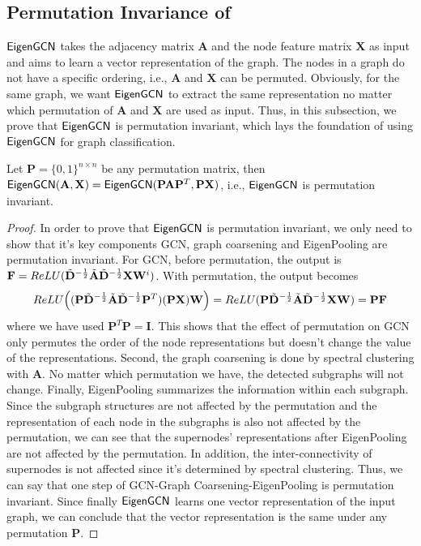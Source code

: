 \documentclass[sigconf]{acmart}
\newcommand{\m}{{\sf {EigenGCN}}}
\begin{document}
\subsection{Permutation Invariance of \m}
$\m$ takes the adjacency matrix $\mathbf{A}$ and the node feature matrix $\mathbf{X}$ as input and aims to learn a vector representation of the graph. The nodes in a graph do not have a specific ordering, i.e., $\mathbf{A}$ and $\mathbf{X}$ can be permuted. Obviously, for the same graph, we want $\m$ to extract the same representation no matter which permutation of $\mathbf{A}$ and $\mathbf{X}$ are used as input. Thus, in this subsection, we prove that $\m$ is permutation invariant, which lays the foundation of using $\m$ for graph classification.
\begin{theorem}
    Let $\mathbf{P} = \{0,1\}^{n \times n}$ be any permutation matrix, then $\m(\mathbf{A}, \mathbf{X}) = \m(\mathbf{P}\mathbf{A}\mathbf{P}^T, \mathbf{P}\mathbf{X})$, i.e., $\m$ is permutation invariant.
\end{theorem}
\vspace{-1em}
\begin{proof}
    In order to prove that $\m$ is permutation invariant, we only need to show that it's key components GCN, graph coarsening and EigenPooling are permutation invariant. For GCN, before permutation, the output is ${\bf F} = ReLU(\tilde{\bf D}^{-\frac{1}{2}}\tilde{\bf A} \tilde{\bf D}^{-\frac{1}{2}} {\bf X} {\bf W}^{i})$. With permutation, the output becomes
    \begin{equation}
        ReLU\Big((\mathbf{P}\tilde{\bf D}^{-\frac{1}{2}}\tilde{\bf A} \tilde{\bf D}^{-\frac{1}{2}} \mathbf{P}^T) (\mathbf{P}{\bf X}) {\bf W}\Big) = ReLU(\mathbf{P}\tilde{\bf D}^{-\frac{1}{2}}\tilde{\bf A} \tilde{\bf D}^{-\frac{1}{2}} {\bf X} {\bf W}) = \mathbf{P} \mathbf{F} \nonumber
    \end{equation}
where we have used $\mathbf{P}^T \mathbf{P} = \mathbf{I}$. This shows that the effect of permutation on GCN only permutes the order of the node representations but doesn't change the value of the representations. Second, the graph coarsening is done by spectral clustering with $\mathbf{A}$. No matter which permutation we have, the detected subgraphs will not change. Finally, EigenPooling summarizes the information within each subgraph. Since the subgraph structures are not affected by the permutation and the representation of each node in the subgraphs is also not affected by the permutation, we can see that the supernodes' representations after EigenPooling are not affected by the permutation. In addition, the inter-connectivity of supernodes is not affected since it's determined by spectral clustering. Thus, we can say that one step of GCN-Graph Coarsening-EigenPooling is permutation invariant. Since finally $\m$ learns one vector representation of the input graph, we can conclude that the vector representation is the same under any permutation $\mathbf{P}$. 
\end{proof}
\end{document}
